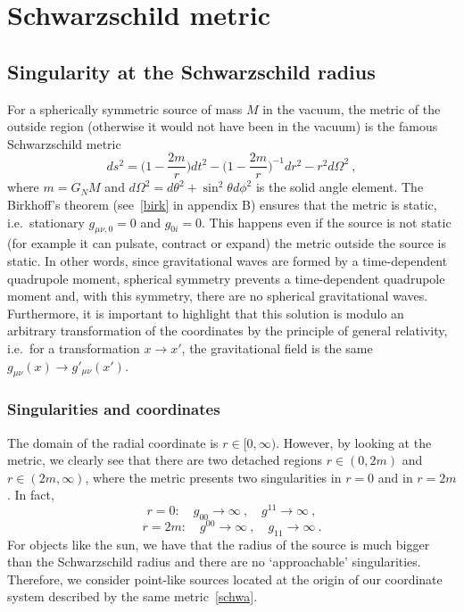 \part{Schwarzschild metric}

\chapter{Singularity at the Schwarzschild radius}

    For a spherically symmetric source of mass $M$ in the vacuum, the metric of the outside region (otherwise it would not have been in the vacuum) is the famous Schwarzschild metric 
    \begin{equation}\label{schwa}
        ds^2 = \Big ( 1 - \frac{2m}{r} \Big ) dt^2 - \Big ( 1 - \frac{2m}{r} \Big)^{-1} dr^2 - r^2 d\Omega^2 ~, 
    \end{equation}
    where $m = G_N M$ and $d\Omega^2 = d\theta^2 + \sin^2 \theta d\phi^2$ is the solid angle element. The Birkhoff's theorem (see~\ref{birk} in appendix B) ensures that the metric is static, i.e.~stationary $g_{\mu\nu,0} = 0$ and $g_{0i} = 0$. This happens even if the source is not static (for example it can pulsate, contract or expand) the metric outside the source is static. In other words, since gravitational waves are formed by a time-dependent quadrupole moment, spherical symmetry prevents a time-dependent quadrupole moment and, with this symmetry, there are no spherical gravitational waves. Furthermore, it is important to highlight that this solution is modulo an arbitrary transformation of the coordinates by the principle of general relativity, i.e.~for a transformation $x \rightarrow x'$, the gravitational field is the same $g_{\mu\nu} (x) \rightarrow g'_{\mu\nu} (x')$.

\section{Singularities and coordinates}

    The domain of the radial coordinate is $r \in [0, \infty)$. However, by looking at the metric, we clearly see that there are two detached regions $r \in (0, 2m)$ and $r \in (2m, \infty)$, where the metric presents two singularities in $r = 0$ and in $r = 2m$. In fact, 
    \begin{equation*}
        r = 0 : \quad g_{00} \rightarrow \infty ~, \quad g^{11} \rightarrow \infty ~,
    \end{equation*}
    \begin{equation*}
        r = 2m : \quad g^{00} \rightarrow \infty ~, \quad g_{11} \rightarrow \infty ~.
    \end{equation*}
    For objects like the sun, we have that the radius of the source is much bigger than the Schwarzschild radius and there are no `approachable' singularities. Therefore, we consider point-like sources located at the origin of our coordinate system described by the same metric~\eqref{schwa}. 

